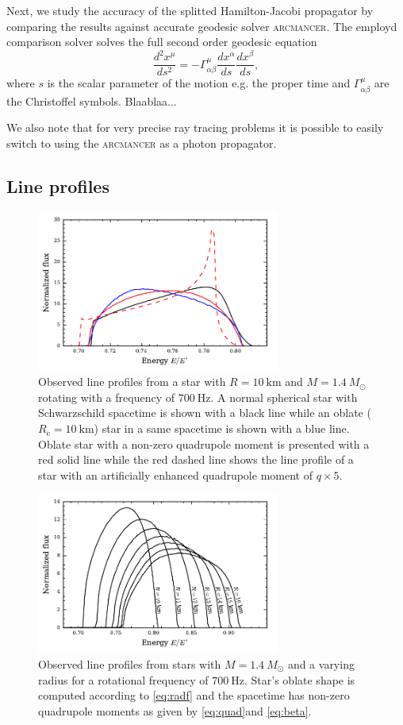 \documentclass[iop, usenatbib]{emulateapj}
\newcommand{\be}{\begin{equation}}
\newcommand{\ee}{\end{equation}}
\newcommand{\sch}{Schwarzschild }
\newcommand{\Msun}{\ensuremath{M_{\odot}}}
\begin{document}
Next, we study the accuracy of the splitted Hamilton-Jacobi propagator by comparing the results against accurate geodesic solver \textsc{arcmancer}.
The employd comparison solver solves the full second order geodesic equation
\be
\frac{d^2 x^{\mu}}{ds^2} = -\Gamma^{\mu}_{\alpha \beta} \frac{dx^{\alpha}}{ds} \frac{dx^{\beta}}{ds},
\ee
where $s$ is the scalar parameter of the motion e.g. the proper time and $\Gamma^{\mu}_{\alpha \beta}$ are the Christoffel symbols.
Blaablaa...

We also note that for very precise ray tracing problems it is possible to easily switch to using the \textsc{arcmancer} as a photon propagator.





\subsection{Line profiles}

\begin{figure}
\includegraphics[width=8cm]{figs/fig9a.pdf}
\caption{\label{fig:line_profiles}
  Observed line profiles from a star with $R=10~\mathrm{km}$ and $M=1.4~\Msun$ rotating with a frequency of $700~\mathrm{Hz}$.
  A normal spherical star with \sch spacetime is shown with a black line while an oblate ($R_{\mathrm{e}}=10~\mathrm{km}$) star in a same spacetime is shown with a blue line.
  Oblate star with a non-zero quadrupole moment is presented with a red solid line while the red dashed line shows the line profile of a star with an artificially enhanced quadrupole moment of $q \times 5$.
  }
\end{figure}


\begin{figure}
\includegraphics[width=8cm]{figs/fig9c.pdf}
\caption{\label{fig:line_profiles}
  Observed line profiles from stars with $M = 1.4~\Msun$ and a varying radius for a rotational frequency of $700~\mathrm{Hz}$.
  Star's oblate shape is computed according to \eqref{eq:radf} and the spacetime has non-zero quadrupole moments as given by \eqref{eq:quad}\ and \eqref{eq:beta}.
  }
\end{figure}
\end{document}
